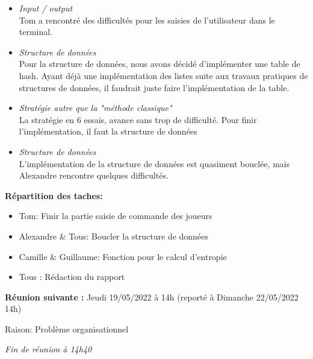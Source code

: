 \documentclass[12pt,a4paper,final]{report}
\begin{document}
\begin{itemize}
    \item \textit{Input / output} \\
    Tom a rencontré des difficultés pour les saisies de l'utilisateur dans le terminal. \\
    \item \textit{Structure de données} \\
    Pour la structure de données, nous avons décidé d'implémenter une table de hash. Ayant déjà une implémentation des listes suite aux travaux pratiques de structures de données, il faudrait juste faire l'implémentation de la table. \\ 
    \item \textit{Stratégie autre que la "méthode classique"} \\
    La stratégie en 6 essais, avance sans trop de difficulté. Pour finir l'implémentation, il faut la structure de données 
    \item \textit{Structure de données} \\
    L'implémentation de la structure de données est quasiment bouclée, mais Alexandre rencontre quelques difficultés.
\end{itemize}


\begin{flushleft}
    \textbf{Répartition des taches:}
\end{flushleft}
\begin{itemize}
    \item Tom: Finir la partie saisie de commande des joueurs \\
    \item Alexandre \& Tous: Boucler la structure de données \\
    \item Camille \& Guillaume: Fonction pour le calcul d'entropie \\
    \item Tous : Rédaction du rapport \\
\end{itemize}

\begin{flushleft}
    \textbf{Réunion suivante :} Jeudi 19/05/2022 à 14h (reporté à Dimanche 22/05/2022 14h)
    \item Raison: Problème organisationnel
\end{flushleft}

\textit{Fin de réunion à 14h40}
\end{document}
